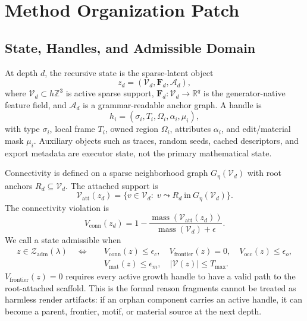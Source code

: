 \section{Method Organization Patch}


\subsection{State, Handles, and Admissible Domain}

At depth $d$, the recursive state is the sparse-latent object
\begin{equation}
  z_d=(\mathcal V_d,\mathbf F_d,\mathcal A_d),
\end{equation}
where $\mathcal V_d\subset h\mathbb Z^3$ is active sparse support,
$\mathbf F_d:\mathcal V_d\rightarrow\mathbb R^q$ is the generator-native feature
field, and $\mathcal A_d$ is a grammar-readable anchor graph. A handle is
\begin{equation}
  h_i=(\sigma_i,T_i,\Omega_i,\alpha_i,\mu_i),
\end{equation}
with type $\sigma_i$, local frame $T_i$, owned region $\Omega_i$, attributes
$\alpha_i$, and edit/material mask $\mu_i$. Auxiliary objects such as traces,
random seeds, cached descriptors, and export metadata are executor state, not
the primary mathematical state.

Connectivity is defined on a sparse neighborhood graph
$G_\eta(\mathcal V_d)$ with root anchors $R_d\subseteq\mathcal V_d$. The attached
support is
\begin{equation}
  \mathcal V_{\mathrm{att}}(z_d)=
  \{v\in\mathcal V_d:\; v\leadsto R_d\ \mathrm{in}\ G_\eta(\mathcal V_d)\}.
\end{equation}
The connectivity violation is
\begin{equation}
  V_{\mathrm{conn}}(z_d)=
  1-\frac{\operatorname{mass}(\mathcal V_{\mathrm{att}}(z_d))}
  {\operatorname{mass}(\mathcal V_d)+\epsilon}.
\end{equation}
We call a state admissible when
\begin{equation}
\begin{split}
  z\in\mathcal Z_{\mathrm{adm}}(\lambda)
  \quad\Longleftrightarrow\quad
  &V_{\mathrm{conn}}(z)\le\epsilon_c,\quad
  V_{\mathrm{frontier}}(z)=0,\quad
  V_{\mathrm{occ}}(z)\le\epsilon_o,\\
  &V_{\mathrm{mat}}(z)\le\epsilon_m,\quad
  |\mathcal V(z)|\le T_{\max}.
\end{split}
\end{equation}
$V_{\mathrm{frontier}}(z)=0$ requires every active growth handle to have a valid
path to the root-attached scaffold. This is the formal reason fragments cannot
be treated as harmless render artifacts: if an orphan component carries an
active handle, it can become a parent, frontier, motif, or material source at
the next depth.

